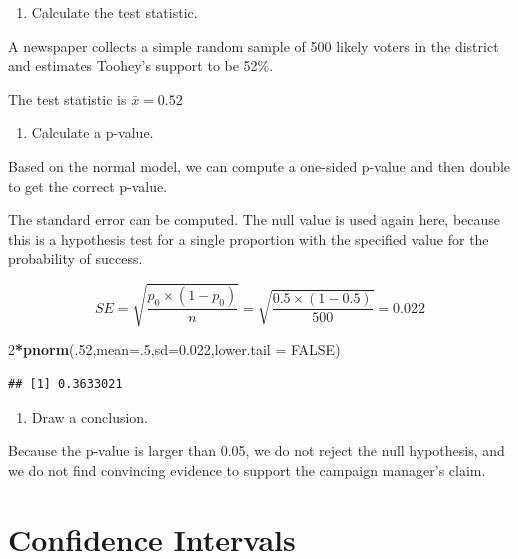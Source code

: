 \documentclass[
]{book}
\newenvironment{Shaded}{\begin{snugshade}}{\end{snugshade}}
\newcommand{\DataTypeTok}[1]{\textcolor[rgb]{0.13,0.29,0.53}{#1}}
\newcommand{\DecValTok}[1]{\textcolor[rgb]{0.00,0.00,0.81}{#1}}
\newcommand{\FloatTok}[1]{\textcolor[rgb]{0.00,0.00,0.81}{#1}}
\newcommand{\KeywordTok}[1]{\textcolor[rgb]{0.13,0.29,0.53}{\textbf{#1}}}
\newcommand{\NormalTok}[1]{#1}
\newcommand{\OperatorTok}[1]{\textcolor[rgb]{0.81,0.36,0.00}{\textbf{#1}}}
\newcommand{\OtherTok}[1]{\textcolor[rgb]{0.56,0.35,0.01}{#1}}
\providecommand{\tightlist}{%
  \setlength{\itemsep}{0pt}\setlength{\parskip}{0pt}}
\begin{document}
\begin{enumerate}
\def\labelenumi{\alph{enumi}.}
\setcounter{enumi}{4}
\tightlist
\item
  Calculate the test statistic.
\end{enumerate}

A newspaper collects a simple random sample of 500 likely voters in the district and estimates Toohey's support to be 52\%.

The test statistic is \(\bar{x}=0.52\)

\begin{enumerate}
\def\labelenumi{\alph{enumi}.}
\setcounter{enumi}{5}
\tightlist
\item
  Calculate a p-value.
\end{enumerate}

Based on the normal model, we can compute a one-sided p-value and then double to get the correct p-value.

The standard error can be computed. The null value is used again here, because this is a hypothesis test for a single proportion with the specified value for the probability of success.

\[SE = \sqrt{\frac{p_0\times (1-p_0)}{n}} = \sqrt{\frac{0.5\times (1-0.5)}{500}} = 0.022\]

\begin{Shaded}
\begin{Highlighting}[]
\DecValTok{2}\OperatorTok{*}\KeywordTok{pnorm}\NormalTok{(.}\DecValTok{52}\NormalTok{,}\DataTypeTok{mean=}\NormalTok{.}\DecValTok{5}\NormalTok{,}\DataTypeTok{sd=}\FloatTok{0.022}\NormalTok{,}\DataTypeTok{lower.tail =} \OtherTok{FALSE}\NormalTok{)}
\end{Highlighting}
\end{Shaded}

\begin{verbatim}
## [1] 0.3633021
\end{verbatim}

\begin{enumerate}
\def\labelenumi{\alph{enumi}.}
\setcounter{enumi}{6}
\tightlist
\item
  Draw a conclusion.
\end{enumerate}

Because the p-value is larger than 0.05, we do not reject the null hypothesis, and we do not find convincing evidence to support the campaign manager's claim.

\hypertarget{CI}{%
\chapter{Confidence Intervals}\label{CI}}
\end{document}
